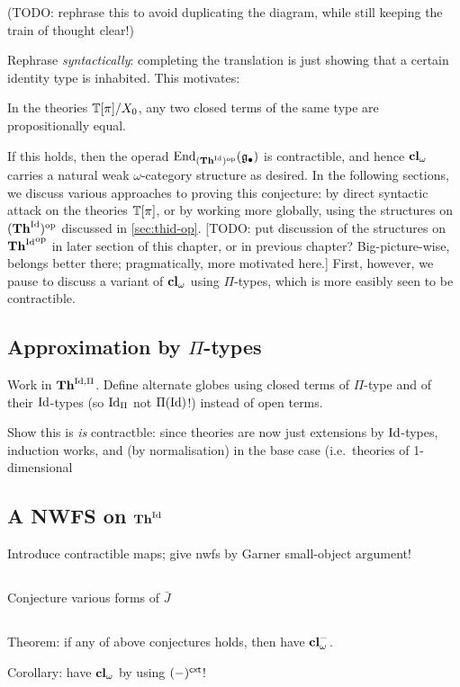 (TODO: rephrase this to avoid duplicating the diagram, while still keeping the train of thought clear!)

Rephrase \emph{syntactically}: completing the translation is just showing that a certain identity type is inhabited.   This motivates:

\begin{conjecture}In the theories $\mathbb{T}[\pi]/X_0$, any two closed terms of the same type are propositionally equal.
\end{conjecture}

If this holds, then the operad $\mathrm{End}_{(\mathbf{Th}^{\mathrm{Id}})^{\mathrm{op}}}(\mathfrak{g}_\bullet)$ is contractible, and hence $\mathbf{cl}_\omega$ carries a natural weak $\omega$-category structure as desired.  In the following sections, we discuss various approaches to proving this conjecture: by direct syntactic attack on the theories $\mathbb{T}[\pi]$, or by working more globally, using the structures on $(\mathbf{Th}^{\mathrm{Id}})^{\mathrm{op}}$ discussed in \ref{sec:thid-op}.  [TODO: put discussion of the structures on ${\mathbf{Th}^{\mathrm{Id}}}^{\mathrm{op}}$ in later section of this chapter, or in previous chapter?  Big-picture-wise, belongs better there; pragmatically, more motivated here.]  First, however, we pause to discuss a variant of $\mathbf{cl}_\omega$ using $\Pi$-types, which is more easibly seen to be contractible.

\subsection*{Approximation by $\Pi$-types}

Work in $\mathbf{Th}^{\mathrm{Id},\Pi}$.  Define alternate globes using closed terms of $\Pi$-type and of their $\mathrm{Id}$-types (so $\mathrm{Id}_\Pi$ not $\Pi (\mathrm{Id})$!) instead of open terms.

Show this is \emph{is} contractble: since theories are now just extensions by $\mathrm{Id}$-types, induction works, and (by normalisation) in the base case (i.e.\ theories of 1-dimensional

\subsection*{A NWFS on $\mathbf{Th}^{\mathrm{Id}}$} Introduce contractible maps; give nwfs by Garner small-object argument!

\subsection*{} Conjecture various forms of $\bar{J}$

\subsection*{} Theorem: if any of above conjectures holds, then have $\mathbf{cl}^-_\omega$.

\begin{para} Corollary: have $\mathbf{cl}_\omega$ by using $(-)^{\mathsf{cxt}}$!
\end{para}


